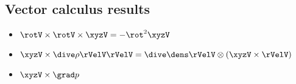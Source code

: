 \begin{appendices}

\section{Vector calculus results}

\begin{itemize}
\item $\rotV \times \rotV \times \xyzV = - \rot^2 \xyzV$
\item $\xyzV \times \dive \rho \rVelV \rVelV = 
  \dive \dens \rVelV \otimes (\xyzV \times \rVelV)$ 
\item $\xyzV \times \grad p$
\end{itemize}



\end{appendices}
